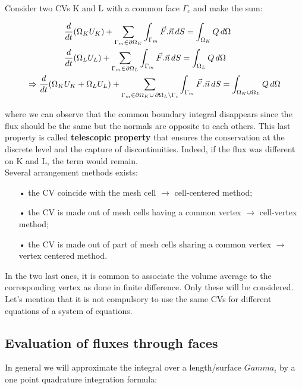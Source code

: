 Consider two CVs K and L with a common face $\Gamma _c$ and make the sum: 

\begin{equation}
\begin{aligned}
&\frac{d}{dt}(\Omega _K U_K) + \sum _{\Gamma _m \in \partial \Omega _K} \int _{\Gamma _m} \vec{F}.\vec{n}\, dS = \int _{\Omega _K}Q\, d\Omega \\
 &\frac{d}{dt}(\Omega _L U_L) + \sum _{\Gamma _m \in \partial \Omega _L} \int _{\Gamma _m} \vec{F}.\vec{n}\, dS = \int _{\Omega _L}Q\, d\Omega\\
 \Rightarrow \frac{d}{dt}(\Omega _K &U_K + \Omega _L U_L) + \sum _{\Gamma _m \in \partial \Omega _K \cup\, \partial\Omega _L \setminus \Gamma _c} \int _{\Gamma _m} \vec{F}.\vec{n}\, dS = \int _{\Omega _K\cup \Omega _L}Q\, d\Omega 
\end{aligned}
\end{equation}

where we can observe that the common boundary integral disappears since the flux should be the same but the normals are opposite to each others. This last property is called \textbf{telescopic property} that ensures the conservation at the discrete level and the capture of discontinuities. Indeed, if the flux was different on K and L, the term would remain. \\

Several arrangement methods exists: 
\begin{itemize}
\item[•] the CV coincide with the mesh cell $\rightarrow$ cell-centered method;
\item[•] the CV is made out of mesh cells having a common vertex $\rightarrow$ cell-vertex method;
\item[•] the CV is made out of part of mesh cells sharing a common vertex $\rightarrow$ vertex centered method. \\
\end{itemize}

In the two last ones, it is common to associate the volume average to the corresponding vertex as done in finite difference. Only these will be considered. Let's mention that it is not compulsory to use the same CVs for different equations of a system of equations. 

\subsection{Evaluation of fluxes through faces}
In general we will approximate the integral over a length/surface $Gamma _i$ by a one point quadrature integration formula: 

